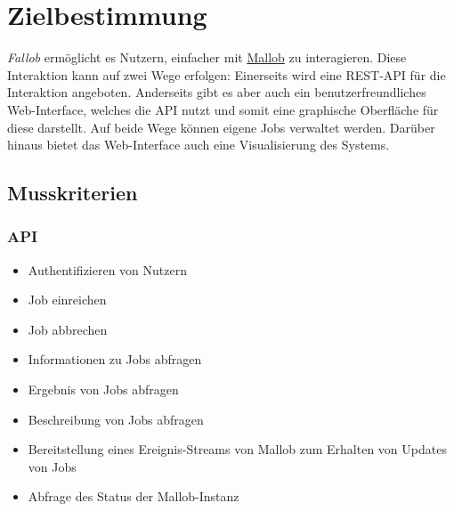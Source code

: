 \section{Zielbestimmung}
\textit{Fallob} ermöglicht es Nutzern, einfacher mit \href{https://github.com/domschrei/mallob}{Mallob} zu interagieren. Diese Interaktion kann auf zwei Wege erfolgen:
Einerseits wird eine REST-API für die Interaktion angeboten. Anderseits gibt es aber auch ein benutzerfreundliches Web-Interface, welches die API nutzt und somit eine graphische Oberfläche für diese darstellt. Auf beide Wege können eigene Jobs verwaltet werden. Darüber hinaus bietet das Web-Interface auch eine Visualisierung des Systems.


\subsection{Musskriterien}
    \subsubsection{API}
        \begin{itemize}[noitemsep]
            \item Authentifizieren von Nutzern
            \item Job einreichen
            \item Job abbrechen
            \item Informationen zu Jobs abfragen
            \item Ergebnis von Jobs abfragen
            \item Beschreibung von Jobs abfragen
            \item Bereitstellung eines Ereignis-Streams von Mallob zum Erhalten von Updates von Jobs
            \item Abfrage des Status der Mallob-Instanz
        \end{itemize}
